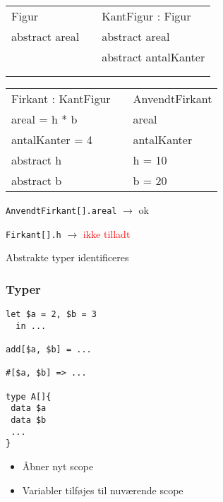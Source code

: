 \begin{frame}[fragile] 
\begin{table}[h]
\begin{tabular}{|l|l|l|}
 \cline{1-1} \cline{3-3} 
Figur          &  & KantFigur : Figur    \\ \cline{1-1} \cline{3-3} 
abstract areal &  & abstract areal       \\
               &  & abstract antalKanter \\
               &  &                      \\
               &  &                      \\ \cline{1-1} \cline{3-3} 
\end{tabular}
\end{table}
\begin{table}[h]
\begin{tabular}{|l|l|l|}
 \cline{1-1} \cline{3-3} 
Firkant : KantFigur &  & AnvendtFirkant       \\ \cline{1-1} \cline{3-3} 
areal = h * b       &  & areal                \\
antalKanter = 4     &  & antalKanter          \\
abstract h          &  & h = 10               \\
abstract b          &  & b = 20               \\ \cline{1-1} \cline{3-3} 
\end{tabular}
\end{table}
\begin{center}
\texttt{AnvendtFirkant[].areal} $\rightarrow$ ok

\texttt{Firkant[].h} $\rightarrow$ \textcolor{red}{ikke tilladt}

Abstrakte typer identificeres
\end{center}
\end{frame}

\begin{frame}[fragile]
\frametitle{Typer}
\begin{lstlisting}
let $a = 2, $b = 3 
  in ...

add[$a, $b] = ...

#[$a, $b] => ...

type A[]{
 data $a
 data $b
 ...
}
\end{lstlisting}
\begin{center}
\begin{itemize}                                  
\item Åbner nyt scope
\item Variabler tilføjes til nuværende scope
\end{itemize}
\end{center}
\end{frame}

